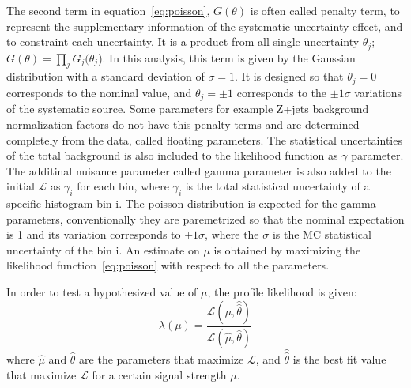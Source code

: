 The second term in equation~\ref{eq:poisson}, $G(\theta)$ is often called penalty term, to represent the supplementary information of the systematic uncertainty effect, and to constraint each uncertainty. It is a product from all single uncertainty $\theta_j$; $G(\theta) = \prod_{j}G_{j}(\theta_{j}$). 
In this analysis, this term is given by the Gaussian distribution with a standard deviation of $\sigma = 1$. It is designed so that $\theta_j = 0$ corresponds to the nominal value, and $\theta_j = \pm 1$ corresponds to the $\pm 1 \sigma$ variations of the systematic source. 
Some parameters for example Z+jets background normalization factors do not have this penalty terms and are determined completely from the data, called floating parameters.
The statistical uncertainties of the total background is also included to the likelihood function as $\gamma$ parameter. 
The additinal nuisance parameter called gamma parameter is also added to the initial $\mathcal{L}$ as $\gamma_i$ for each bin, where $\gamma_i$ is the total statistical uncertainty of a specific histogram bin i. 
The poisson distribution is expected for the gamma parameters, conventionally they are paremetrized so that the nominal expectation is 1 and its variation corresponds to $\pm 1 \sigma$, where the $\sigma$ is the MC statistical uncertainty of the bin i.
An estimate on $\mu$ is obtained by maximizing the likelihood function~\ref{eq:poisson} with respect to all the parameters.  

In order to test a hypothesized value of $\mu$, the profile likelihood is given:
\begin{equation}
\lambda(\mu) = \frac{\mathcal{L}\left(\mu, \hat{\hat{\theta}}\right)}{\mathcal{L}(\hat{\mu}, \hat{\theta})}
\end{equation}
where $\hat{\mu}$ and $\hat{\theta}$ are the parameters that maximize $\mathcal{L}$, and $\hat{\hat{\theta}}$ is the best fit value that maximize $\mathcal{L}$ for a certain signal strength $\mu$.

